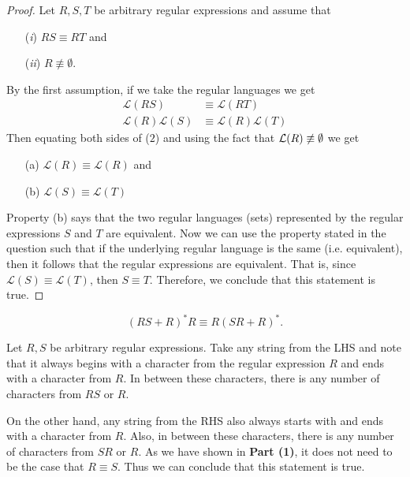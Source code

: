 	\begin{proof}
	    Let $R, S, T$ be arbitrary regular expressions and assume
	    that 
	    \begin{itemize}
	        \item [(\emph{i})] $RS \equiv RT$ and
	        \item [(\emph{ii})] $R \not\equiv \emptyset$.
	    \end{itemize}
	    By the first assumption, if we take the regular languages
	    we get 
	    \begin{align}
	        \mathcal{L}(RS) &\equiv \mathcal{L}(RT) \\
	        \mathcal{L}(R) \mathcal{L}(S) &\equiv \mathcal{L}(R) 
	        \mathcal{L}(T)
	    \end{align}
	    Then equating both sides of ($2$) and using the fact that 
	    $\mathcal{L}(R) \not\equiv \emptyset$ we get
	    \begin{itemize}
	        \item [(a)] $\mathcal{L}(R) \equiv \mathcal{L}(R)$ and 
	        \item [(b)] $\mathcal{L}(S) \equiv \mathcal{L}(T)$
	    \end{itemize}
	    Property (b) says that the two regular languages (sets)
	    represented by the regular expressions $S$ and $T$ are 
	    equivalent. Now we can use the property stated in the 
	    question such that if the underlying regular language 
	    is the same (i.e. equivalent), then it follows that 
	    the regular expressions are equivalent. That is, since
	    $\mathcal{L}(S) \equiv \mathcal{L}(T)$, then $S \equiv T$.
	    Therefore, we conclude that this statement is true.
	\end{proof}
	
\newpage

	\[
	(RS + R)^*R \equiv R(SR+R)^*.
	\]
	
	Let $R, S$ be arbitrary regular expressions.
	Take any string from the LHS and note that it always 
	begins with a character from the regular expression
	$R$ and ends with a character from $R$. In between
	these characters, there is any number of characters from
	$RS$ or $R$.
	
	On the other hand, any string from the RHS also
	always starts with and ends with a character from
	$R$. Also, in between these characters, there is 
	any number of characters from $SR$ or $R$. As we 
	have shown in \textbf{Part (1)}, it does not need
	to be the case that $R \equiv S$. Thus we can 
	conclude that this statement is true.
	
